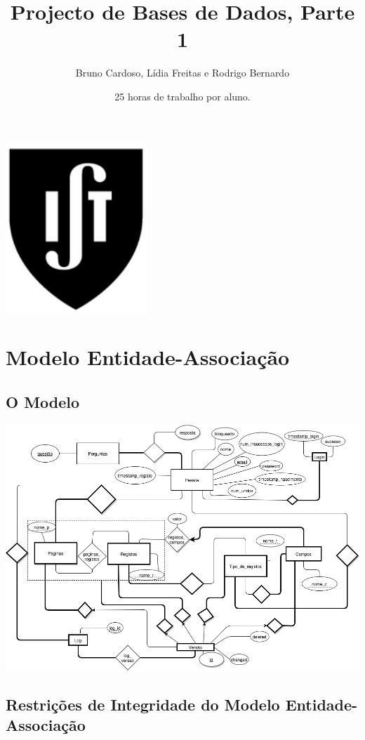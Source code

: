 \documentclass[11pt,a4paper]{article}
\title{\textbf{Projecto de Bases de Dados, Parte 1}}
\author{Bruno Cardoso, Lídia Freitas e Rodrigo Bernardo}
\affil{Instituto Superior T\'{e}cnico}
\begin{document}
\date{25 horas de trabalho por aluno.}

\maketitle

\centerline{\includegraphics[width=0.4\textwidth]{ist-simbolo.jpg}}
\newpage

\tableofcontents
\newpage

\section{Modelo Entidade-Associa\c{c}\~ao}
\subsection{O Modelo}

\centerline{\includegraphics[width=1.0\textwidth]{modelo-ea-2.png}}

\newpage

\subsection{Restri\c{c}\~oes de Integridade do Modelo Entidade-Associa\c{c}\~ao}
\end{document}
